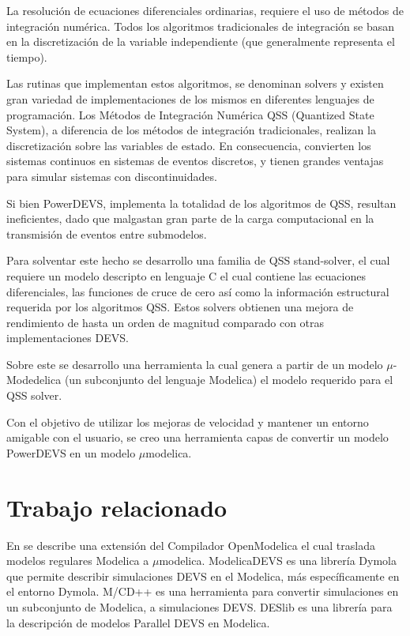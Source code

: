 La resolución de ecuaciones diferenciales ordinarias, requiere el uso de métodos de integración numérica. Todos los algoritmos tradicionales de integración se basan en la discretización de la variable independiente (que generalmente representa el tiempo).

Las rutinas que implementan estos algoritmos, se denominan solvers y existen gran variedad de implementaciones de los mismos en diferentes lenguajes de programación. Los Métodos de Integración Numérica QSS (Quantized State System), a diferencia de los métodos de integración tradicionales, realizan la discretización sobre las variables de estado. En consecuencia, convierten los sistemas continuos en sistemas de eventos discretos, y tienen grandes ventajas para simular sistemas con discontinuidades.

Si bien PowerDEVS, implementa la totalidad de los algoritmos de QSS, resultan ineficientes, dado que malgastan gran parte de la carga computacional en la transmisión de eventos entre submodelos.

Para solventar este hecho se desarrollo una familia de QSS stand-solver, el cual requiere un modelo descripto en lenguaje C el cual contiene las ecuaciones diferenciales, las funciones de cruce de cero así como la información estructural requerida por los algoritmos QSS. Estos solvers obtienen una mejora de rendimiento de hasta un orden de magnitud comparado con otras implementaciones DEVS.

Sobre este se desarrollo una herramienta la cual genera a partir de un modelo $\mu$-Modedelica \cite{Ber12} (un subconjunto del lenguaje Modelica) el modelo requerido para el QSS solver.

Con el objetivo de utilizar los mejoras de velocidad y mantener un entorno amigable con el usuario, se creo una herramienta capas de convertir un modelo PowerDEVS en un modelo $\mu$modelica.


\section{Trabajo relacionado}
En \cite{Ber12} se describe una extensión del Compilador OpenModelica el cual traslada modelos regulares Modelica a $\mu$modelica. 
ModelicaDEVS \cite{Beltrame06quantisedstate} es una librería Dymola que permite describir simulaciones DEVS en el Modelica, más específicamente en el entorno Dymola.
M/CD++ \cite{conf/mascots/DAbreuW05} es una herramienta para convertir simulaciones en un subconjunto de Modelica, a simulaciones DEVS.
DESlib \cite{Sanz09paralleldevs} es una librería para la descripción de modelos Parallel DEVS en Modelica.


